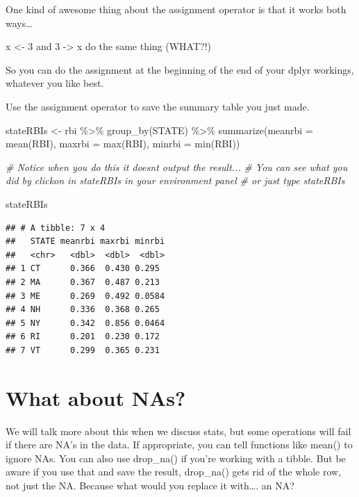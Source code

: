 \documentclass[
]{book}
\newenvironment{Shaded}{\begin{snugshade}}{\end{snugshade}}
\newcommand{\AttributeTok}[1]{\textcolor[rgb]{0.77,0.63,0.00}{#1}}
\newcommand{\CommentTok}[1]{\textcolor[rgb]{0.56,0.35,0.01}{\textit{#1}}}
\newcommand{\FunctionTok}[1]{\textcolor[rgb]{0.00,0.00,0.00}{#1}}
\newcommand{\NormalTok}[1]{#1}
\newcommand{\OtherTok}[1]{\textcolor[rgb]{0.56,0.35,0.01}{#1}}
\newcommand{\SpecialCharTok}[1]{\textcolor[rgb]{0.00,0.00,0.00}{#1}}
\begin{document}
One kind of awesome thing about the assignment operator is that it works both ways\ldots{}

x \textless- 3 and 3 -\textgreater{} x do the same thing (WHAT?!)

So you can do the assignment at the beginning of the end of your dplyr workings, whatever you like best.

Use the assignment operator to save the summary table you just made.

\begin{Shaded}
\begin{Highlighting}[]
\NormalTok{stateRBIs }\OtherTok{\textless{}{-}}\NormalTok{ rbi }\SpecialCharTok{\%\textgreater{}\%}
  \FunctionTok{group\_by}\NormalTok{(STATE) }\SpecialCharTok{\%\textgreater{}\%}
  \FunctionTok{summarize}\NormalTok{(}\AttributeTok{meanrbi =} \FunctionTok{mean}\NormalTok{(RBI), }\AttributeTok{maxrbi =} \FunctionTok{max}\NormalTok{(RBI), }\AttributeTok{minrbi =} \FunctionTok{min}\NormalTok{(RBI))}

\CommentTok{\# Notice when you do this it doesn\textquotesingle{}t output the result... }
\CommentTok{\# You can see what you did by clickon in stateRBIs in your environment panel}
\CommentTok{\# or just type stateRBIs}

\NormalTok{stateRBIs}
\end{Highlighting}
\end{Shaded}

\begin{verbatim}
## # A tibble: 7 x 4
##   STATE meanrbi maxrbi minrbi
##   <chr>   <dbl>  <dbl>  <dbl>
## 1 CT      0.366  0.430 0.295 
## 2 MA      0.367  0.487 0.213 
## 3 ME      0.269  0.492 0.0584
## 4 NH      0.336  0.368 0.265 
## 5 NY      0.342  0.856 0.0464
## 6 RI      0.201  0.230 0.172 
## 7 VT      0.299  0.365 0.231
\end{verbatim}

\hypertarget{what-about-nas}{%
\section{What about NAs?}\label{what-about-nas}}

We will talk more about this when we discuss stats, but some operations will fail if there are NA's in the data. If appropriate, you can tell functions like mean() to ignore NAs. You can also use drop\_na() if you're working with a tibble. But be aware if you use that and save the result, drop\_na() gets rid of the whole row, not just the NA. Because what would you replace it with\ldots. an NA?
\end{document}
